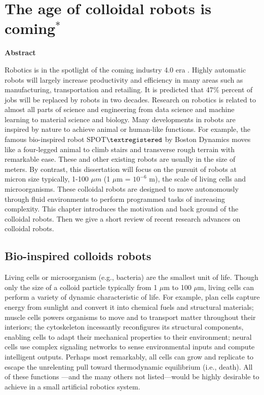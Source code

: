 \chapter{The age of colloidal robots is coming$^{*}$}
\begin{center}
\vspace*{1\baselineskip}
\textbf{Abstract}
\end{center}
Robotics is in the spotlight of the coming industry 4.0 era \autocite{lasi2014industry}. Highly automatic robots will largely increase productivity and efficiency in many areas such as manufacturing, transportation and retailing. 
It is predicted that 47$\%$ percent of jobs will be replaced by robots in two decades\autocite{frey2013future}.
Research on robotics is related to almost all parts of science and engineering from data science and machine learning to material science and biology. Many developments in robots are inspired by nature to achieve animal or human-like functions. For example,  the famous  bio-inspired robot SPOT$\textregistered$  by Boston Dynamics \autocite{yang2019ten} moves like a four-legged animal to climb stairs and transverse rough terrain with remarkable ease. These and other existing robots are usually in the size of meters. By contrast, this dissertation will focus on the pursuit of robots at micron size typically, 1-100 $\mu m$ (1 $\mu$m = $10^{-6}$ m), the scale of living cells and microorganisms. These colloidal robots are designed to move autonomously through fluid environments to perform programmed tasks of increasing complexity. This chapter introduces the motivation and back ground of the colloidal robots. Then we give a short review of recent research advances on colloidal robots.

\section{Bio-inspired colloids robots}
Living cells or microorganism (e.g., bacteria) are the smallest unit of life. Though  only the size of a colloid particle typically from 1 $\mu$m to 100 $\mu$m, living cells can perform  a variety of dynamic characteristic of life. For example, plan cells capture energy from sunlight and convert it into chemical fuels and structural materials; muscle cells powers organisms to move and to transport matter throughout their interiors; the cytoskeleton incessantly reconfigures its structural components, enabling cells to adapt their mechanical properties to their environment; neural cells use complex signaling networks to sense environmental inputs and compute intelligent outputs. Perhaps most remarkably, all cells can grow and replicate to escape the unrelenting pull toward thermodynamic equilibrium (i.e., death).  All of these functions ---and the many others not listed---would be highly desirable to achieve in a small artificial robotics system. 

